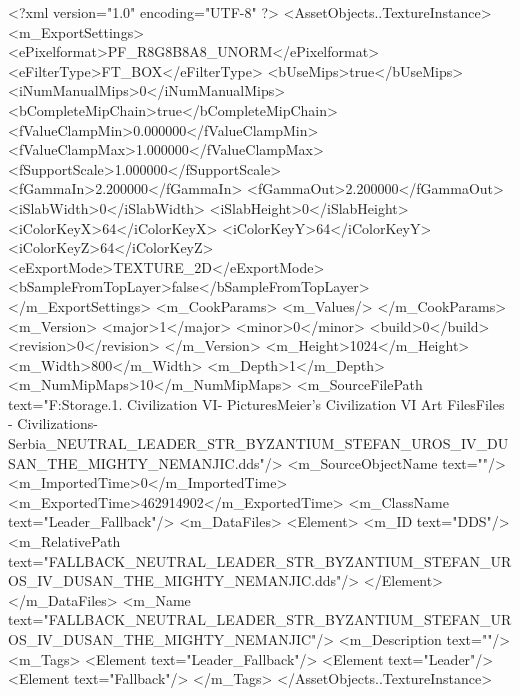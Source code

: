 <?xml version="1.0" encoding="UTF-8" ?>
<AssetObjects..TextureInstance>
	<m_ExportSettings>
		<ePixelformat>PF_R8G8B8A8_UNORM</ePixelformat>
		<eFilterType>FT_BOX</eFilterType>
		<bUseMips>true</bUseMips>
		<iNumManualMips>0</iNumManualMips>
		<bCompleteMipChain>true</bCompleteMipChain>
		<fValueClampMin>0.000000</fValueClampMin>
		<fValueClampMax>1.000000</fValueClampMax>
		<fSupportScale>1.000000</fSupportScale>
		<fGammaIn>2.200000</fGammaIn>
		<fGammaOut>2.200000</fGammaOut>
		<iSlabWidth>0</iSlabWidth>
		<iSlabHeight>0</iSlabHeight>
		<iColorKeyX>64</iColorKeyX>
		<iColorKeyY>64</iColorKeyY>
		<iColorKeyZ>64</iColorKeyZ>
		<eExportMode>TEXTURE_2D</eExportMode>
		<bSampleFromTopLayer>false</bSampleFromTopLayer>
	</m_ExportSettings>
	<m_CookParams>
		<m_Values/>
	</m_CookParams>
	<m_Version>
		<major>1</major>
		<minor>0</minor>
		<build>0</build>
		<revision>0</revision>
	</m_Version>
	<m_Height>1024</m_Height>
	<m_Width>800</m_Width>
	<m_Depth>1</m_Depth>
	<m_NumMipMaps>10</m_NumMipMaps>
	<m_SourceFilePath text="F:\Mod Storage\2.1. Civilization VI\Mods\Archive - Pictures\Sid Meier's Civilization VI Art Files\Art Files - Civilizations\Civilization - Serbia\FALLBACK_NEUTRAL_LEADER_STR_BYZANTIUM_STEFAN_UROS_IV_DUSAN_THE_MIGHTY_NEMANJIC.dds"/>
	<m_SourceObjectName text=""/>
	<m_ImportedTime>0</m_ImportedTime>
	<m_ExportedTime>462914902</m_ExportedTime>
	<m_ClassName text="Leader_Fallback"/>
	<m_DataFiles>
		<Element>
			<m_ID text="DDS"/>
			<m_RelativePath text="FALLBACK_NEUTRAL_LEADER_STR_BYZANTIUM_STEFAN_UROS_IV_DUSAN_THE_MIGHTY_NEMANJIC.dds"/>
		</Element>
	</m_DataFiles>
	<m_Name text="FALLBACK_NEUTRAL_LEADER_STR_BYZANTIUM_STEFAN_UROS_IV_DUSAN_THE_MIGHTY_NEMANJIC"/>
	<m_Description text=""/>
	<m_Tags>
		<Element text="Leader_Fallback"/>
		<Element text="Leader"/>
		<Element text="Fallback"/>
	</m_Tags>
</AssetObjects..TextureInstance>

